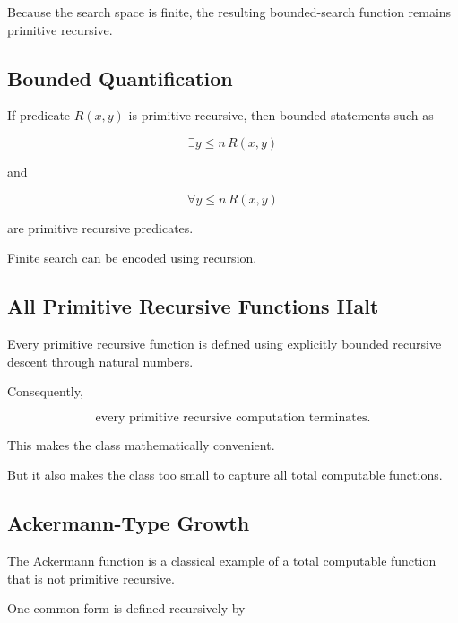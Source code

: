 Because the search space is finite, the resulting bounded-search function
remains primitive recursive.

\subsection{Bounded Quantification}
\label{subsec:bounded-quantification-recursion}

If predicate \(R(x,y)\) is primitive recursive, then bounded statements such
as

\[
\boxed{
\exists y\leq n\,R(x,y)
}
\]

and

\[
\boxed{
\forall y\leq n\,R(x,y)
}
\]

are primitive recursive predicates.

Finite search can be encoded using recursion.

\subsection{All Primitive Recursive Functions Halt}
\label{subsec:primitive-recursive-totality}

Every primitive recursive function is defined using explicitly bounded
recursive descent through natural numbers.

Consequently,

\[
\boxed{
\text{every primitive recursive computation terminates}.
}
\]

This makes the class mathematically convenient.

But it also makes the class too small to capture all total computable
functions.

\subsection{Ackermann-Type Growth}
\label{subsec:ackermann-function}

The Ackermann function is a classical example of a total computable function
that is not primitive recursive.

One common form is defined recursively by

